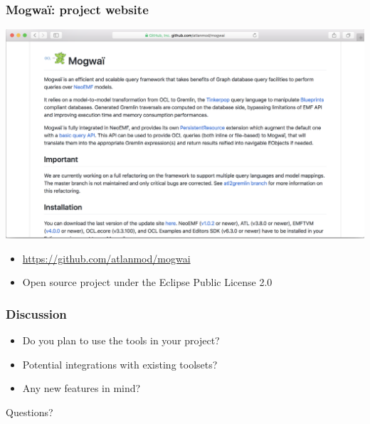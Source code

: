 \begin{frame}\frametitle{Mogwa\"i: project website}
  \begin{center}
    \includegraphics[width=\textwidth]{../02-neoemf/figures/mogwai-github.png}
  \end{center}
	
  \begin{itemize}
  \item \url{https://github.com/atlanmod/mogwai}
  \item Open source project under the Eclipse Public License 2.0
  \end{itemize}
\end{frame}

\begin{frame}\frametitle{Discussion}
\begin{itemize}
\item Do you plan to use the tools in your project?
\item Potential integrations with existing toolsets?
\item Any new features in mind?
\end{itemize}
\end{frame}

\appendix

{
\begin{frame}[standout]
  Questions?
\end{frame}
}



